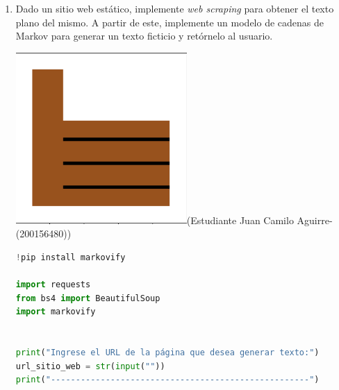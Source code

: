 \begin{enumerate}
\begin{lstlisting}[language=Python]
# Encuentra la secuencia no recurrente
def calcular_no_recurrente(raices):
  expresiones = []

  # Se calcula una expresión para las raíces
  for valor in raices:
    expresion = valor[0]**n
    expresiones.append(expresion)
  solucion = sum(expresiones)

  return(solucion)

# Encontramos términos secuencia no recurrente para 25 términos
def calcular_secuencia(secuencia):
  terminos=[secuencia.subs(n, i0+i) for i in range(25)]
  return (terminos)

# Pedimos al usuario que ingrese los coeficientes de la función
coef_str = input("Ingrese coeficientes de f(n): [cn1 cn2 ... cnk]= ")
coef_ = [int(x) for x in coef_str.split()]

# Pedimos al usuario que ingrese las condiciones iniciales
condiciones_str = input("Ingrese las condiciones iniciales: [a0 a1 ... ak]= ")
ci = [int(x) for x in condiciones_str.split()]

raices = calcular_raiz(coef_, i0)
print('Raíces: \n ', raices)
if not raices:
  print("No hallamos raíces reales")
else:
  sol = calcular_no_recurrente(raices)
  print('RRLNHCCC: \n', sol)

  terminos = calcular_secuencia(sol)
  print('Secuencia no recurrente: \n')
  secuencial = [termino.evalf() for termino in terminos]
  print(secuencial)
    \end{lstlisting}
    \item Dado un sitio web estático, implemente \textit{web scraping} para obtener el texto plano del mismo. A partir de este, implemente un modelo de cadenas de Markov para generar un texto ficticio y retórnelo al usuario.
    
    \includegraphics[width= 10 mm]{figures/exc.png}(Estudiante Juan Camilo Aguirre- (200156480))

    \cite{ChatGPT_MARKOVIFY}
    \begin{lstlisting}[language=Python]
        !pip install markovify

import requests
from bs4 import BeautifulSoup
import markovify


print("Ingrese el URL de la página que desea generar texto:")
url_sitio_web = str(input(""))
print("----------------------------------------------------")




\end{lstlisting}
\end{enumerate}
